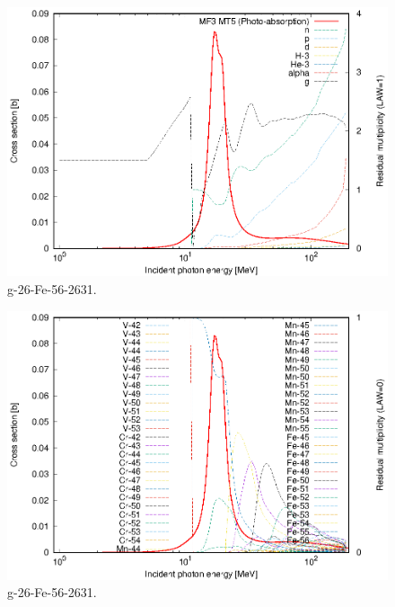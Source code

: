 \begin{figure}
 \includegraphics[width=\linewidth]{eps/g_26-Fe-56_2631.eps}
  \caption{g-26-Fe-56-2631.}
\end{figure}
\begin{figure}
 \includegraphics[width=\linewidth]{eps-law0/g_26-Fe-56_2631.eps}
 \caption{g-26-Fe-56-2631.}
\end{figure}
\newpage \clearpage

